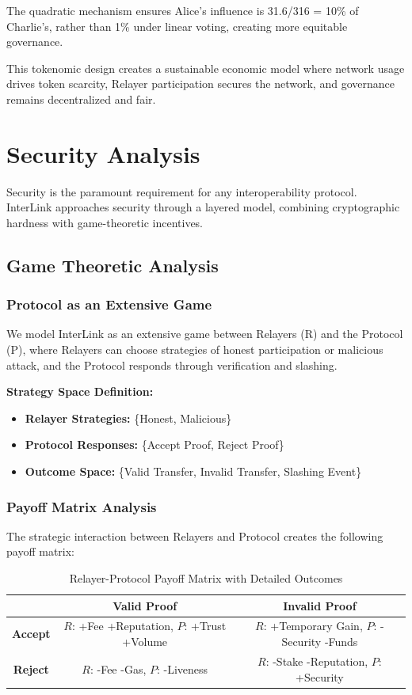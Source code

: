 \documentclass[11pt,a4paper]{article}
\begin{document}
The quadratic mechanism ensures Alice's influence is 31.6/316 = 10\% of Charlie's, rather than 1\% under linear voting, creating more equitable governance.

This tokenomic design creates a sustainable economic model where network usage drives token scarcity, Relayer participation secures the network, and governance remains decentralized and fair.

\section{Security Analysis}
\label{sec:security}

Security is the paramount requirement for any interoperability protocol. InterLink approaches security through a layered model, combining cryptographic hardness with game-theoretic incentives.

\subsection{Game Theoretic Analysis}

\subsubsection{Protocol as an Extensive Game}
We model InterLink as an extensive game between Relayers (R) and the Protocol (P), where Relayers can choose strategies of honest participation or malicious attack, and the Protocol responds through verification and slashing.

\textbf{Strategy Space Definition:}
\begin{itemize}
    \item \textbf{Relayer Strategies:} \{Honest, Malicious\}
    \item \textbf{Protocol Responses:} \{Accept Proof, Reject Proof\}
    \item \textbf{Outcome Space:} \{Valid Transfer, Invalid Transfer, Slashing Event\}
\end{itemize}

\subsubsection{Payoff Matrix Analysis}
The strategic interaction between Relayers and Protocol creates the following payoff matrix:

\begin{table}[H]
\centering
\begin{tabular}{c|c|c}
 & \textbf{Valid Proof} & \textbf{Invalid Proof} \\ \hline
\textbf{Accept} & $R$: +Fee +Reputation, $P$: +Trust +Volume & $R$: +Temporary Gain, $P$: -Security -Funds \\ \hline
\textbf{Reject} & $R$: -Fee -Gas, $P$: -Liveness & $R$: -Stake -Reputation, $P$: +Security \\ \hline
\end{tabular}
\caption{Relayer-Protocol Payoff Matrix with Detailed Outcomes}
\end{table}
\end{document}
